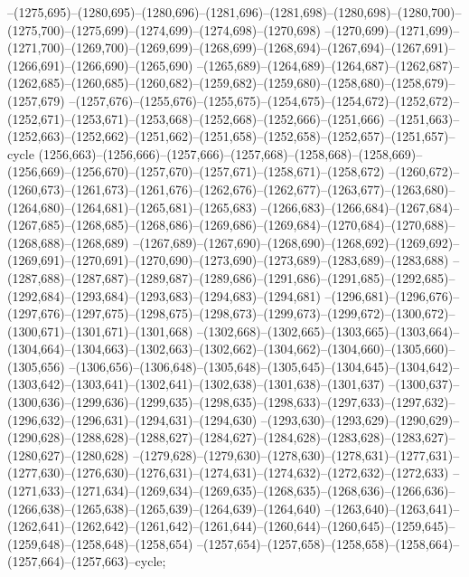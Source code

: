 --(1275,695)--(1280,695)--(1280,696)--(1281,696)--(1281,698)--(1280,698)--(1280,700)--(1275,700)--(1275,699)--(1274,699)--(1274,698)--(1270,698)
--(1270,699)--(1271,699)--(1271,700)--(1269,700)--(1269,699)--(1268,699)--(1268,694)--(1267,694)--(1267,691)--(1266,691)--(1266,690)--(1265,690)
--(1265,689)--(1264,689)--(1264,687)--(1262,687)--(1262,685)--(1260,685)--(1260,682)--(1259,682)--(1259,680)--(1258,680)--(1258,679)--(1257,679)
--(1257,676)--(1255,676)--(1255,675)--(1254,675)--(1254,672)--(1252,672)--(1252,671)--(1253,671)--(1253,668)--(1252,668)--(1252,666)--(1251,666)
--(1251,663)--(1252,663)--(1252,662)--(1251,662)--(1251,658)--(1252,658)--(1252,657)--(1251,657)--cycle
(1256,663)--(1256,666)--(1257,666)--(1257,668)--(1258,668)--(1258,669)--(1256,669)--(1256,670)--(1257,670)--(1257,671)--(1258,671)--(1258,672)
--(1260,672)--(1260,673)--(1261,673)--(1261,676)--(1262,676)--(1262,677)--(1263,677)--(1263,680)--(1264,680)--(1264,681)--(1265,681)--(1265,683)
--(1266,683)--(1266,684)--(1267,684)--(1267,685)--(1268,685)--(1268,686)--(1269,686)--(1269,684)--(1270,684)--(1270,688)--(1268,688)--(1268,689)
--(1267,689)--(1267,690)--(1268,690)--(1268,692)--(1269,692)--(1269,691)--(1270,691)--(1270,690)--(1273,690)--(1273,689)--(1283,689)--(1283,688)
--(1287,688)--(1287,687)--(1289,687)--(1289,686)--(1291,686)--(1291,685)--(1292,685)--(1292,684)--(1293,684)--(1293,683)--(1294,683)--(1294,681)
--(1296,681)--(1296,676)--(1297,676)--(1297,675)--(1298,675)--(1298,673)--(1299,673)--(1299,672)--(1300,672)--(1300,671)--(1301,671)--(1301,668)
--(1302,668)--(1302,665)--(1303,665)--(1303,664)--(1304,664)--(1304,663)--(1302,663)--(1302,662)--(1304,662)--(1304,660)--(1305,660)--(1305,656)
--(1306,656)--(1306,648)--(1305,648)--(1305,645)--(1304,645)--(1304,642)--(1303,642)--(1303,641)--(1302,641)--(1302,638)--(1301,638)--(1301,637)
--(1300,637)--(1300,636)--(1299,636)--(1299,635)--(1298,635)--(1298,633)--(1297,633)--(1297,632)--(1296,632)--(1296,631)--(1294,631)--(1294,630)
--(1293,630)--(1293,629)--(1290,629)--(1290,628)--(1288,628)--(1288,627)--(1284,627)--(1284,628)--(1283,628)--(1283,627)--(1280,627)--(1280,628)
--(1279,628)--(1279,630)--(1278,630)--(1278,631)--(1277,631)--(1277,630)--(1276,630)--(1276,631)--(1274,631)--(1274,632)--(1272,632)--(1272,633)
--(1271,633)--(1271,634)--(1269,634)--(1269,635)--(1268,635)--(1268,636)--(1266,636)--(1266,638)--(1265,638)--(1265,639)--(1264,639)--(1264,640)
--(1263,640)--(1263,641)--(1262,641)--(1262,642)--(1261,642)--(1261,644)--(1260,644)--(1260,645)--(1259,645)--(1259,648)--(1258,648)--(1258,654)
--(1257,654)--(1257,658)--(1258,658)--(1258,664)--(1257,664)--(1257,663)--cycle;
